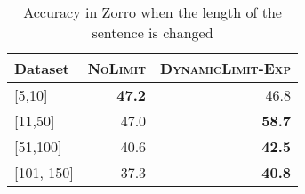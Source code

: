 
\begin{table}[t!]
\small
\centering
\begin{tabular}{lrr} \toprule
Dataset & \textsc{NoLimit} & \textsc{DynamicLimit-Exp} \\  \midrule
{[}5,10{]}   & \textbf{47.2}                        & 46.8  \\
{[}11,50{]}  & 47.0                          & \textbf{58.7}   \\
{[}51,100{]} & 40.6                        & \textbf{42.5}   \\
{[}101, 150{]} &   37.3                & 	\textbf{40.8}   \\ \bottomrule   
\end{tabular}
\caption{Accuracy in Zorro when the length of the sentence is changed}
\label{tab:length}
\end{table}